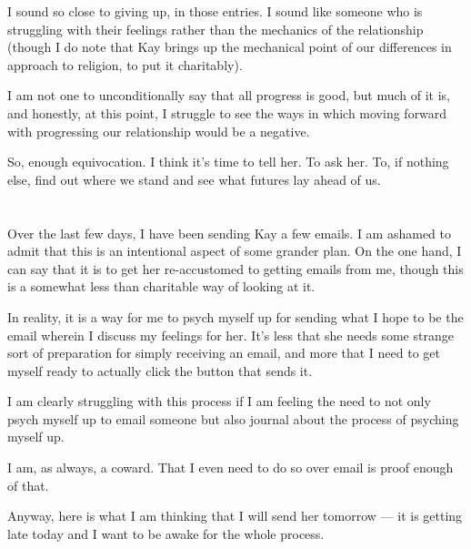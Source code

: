 I sound so close to giving up, in those entries. I sound like someone who is struggling with their feelings rather than the mechanics of the relationship (though I do note that Kay brings up the mechanical point of our differences in approach to religion, to put it charitably).

I am not one to unconditionally say that all progress is good, but much of it is, and honestly, at this point, I struggle to see the ways in which moving forward with progressing our relationship would be a negative.

So, enough equivocation. I think it's time to tell her. To ask her. To, if nothing else, find out where we stand and see what futures lay ahead of us.

\section{}

Over the last few days, I have been sending Kay a few emails. I am ashamed to admit that this is an intentional aspect of some grander plan. On the one hand, I can say that it is to get her re-accustomed to getting emails from me, though this is a somewhat less than charitable way of looking at it.

In reality, it is a way for me to psych myself up for sending what I hope to be the email wherein I discuss my feelings for her. It's less that she needs some strange sort of preparation for simply receiving an email, and more that I need to get myself ready to actually click the button that sends it.

I am clearly struggling with this process if I am feeling the need to not only psych myself up to email someone but also journal about the process of psyching myself up.

I am, as always, a coward. That I even need to do so over email is proof enough of that.

Anyway, here is what I am thinking that I will send her tomorrow --- it is getting late today and I want to be awake for the whole process.

